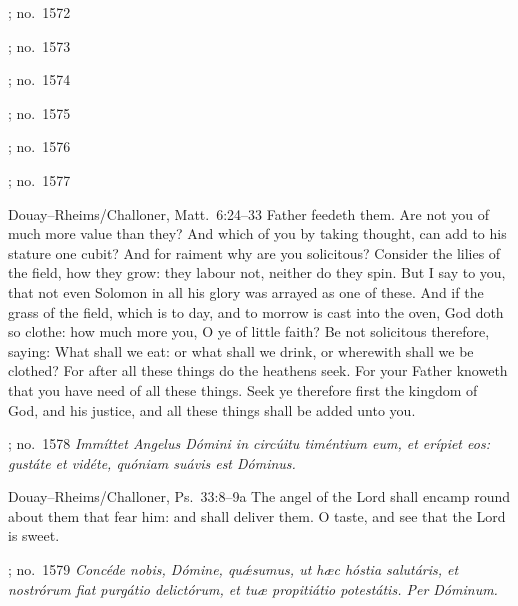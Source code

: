 \begin{massbox}{; no.~1572}
\begin{massbox}{; no.~1573}
\begin{massbox}{; no.~1574}
\begin{massbox}{; no.~1575}
\begin{massbox}{; no.~1576}
\begin{massbox}{; no.~1577}
\begin{fulltextenglish}{Douay--Rheims/Challoner, Matt.~6:24--33}
Father feedeth them. Are not you of much more value than they? And which of
you by taking thought, can add to his stature one cubit? And for raiment why
are you solicitous? Consider the lilies of the field, how they grow: they
labour not, neither do they spin. But I say to you, that not even Solomon in
all his glory was arrayed as one of these. And if the grass of the field,
which is to day, and to morrow is cast into the oven, God doth so clothe: how
much more you, O ye of little faith? Be not solicitous therefore, saying: What
shall we eat: or what shall we drink, or wherewith shall we be clothed? For
after all these things do the heathens seek. For your Father knoweth that you
have need of all these things. Seek ye therefore first the kingdom of God, and
his justice, and all these things shall be added unto you.
\end{fulltextenglish}
\par\smallskip{}

\label{offertory}
\begin{massbox}{; no.~1578}\itshape
Immíttet Angelus Dómini in circúitu timéntium eum, et erípiet eos: gustáte et
vidéte, quóniam suávis est Dóminus.
\finishfulltextelement
\begin{fulltextenglish}{Douay--Rheims/Challoner, Ps.~33:8--9a}
The angel of the Lord shall encamp round about them that fear him: and shall
deliver them. O taste, and see that the Lord is sweet.
\end{fulltextenglish}

\label{secret}
\begin{massbox}{; no.~1579}\itshape
Concéde nobis, Dómine, quǽsumus, ut hæc hóstia salutáris, et nostrórum fiat
purgátio delictórum, et tuæ propitiátio potestátis. Per Dóminum.


\end{massbox}
\end{massbox}
\end{massbox}
\end{massbox}
\end{massbox}
\end{massbox}
\end{massbox}
\end{massbox}
